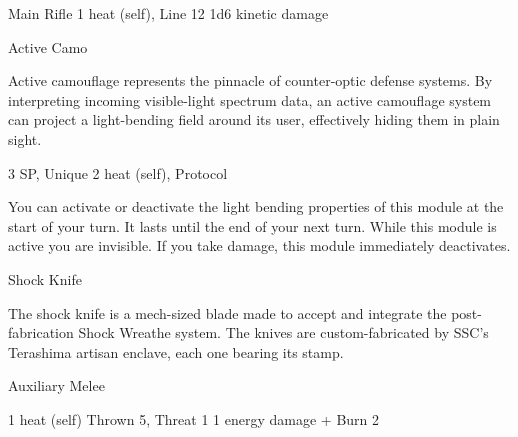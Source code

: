 \begin{mech}
Main Rifle
1 heat (self), Line 12
1d6 kinetic damage


Active Camo

Active camouflage represents the pinnacle of counter-optic defense systems. By interpreting incoming visible-light spectrum data, an active camouflage system can project a light-bending field around its user, effectively hiding them in plain sight.

3 SP, Unique
2 heat (self), Protocol

You can activate or deactivate the light bending properties of this module at the start of your turn. It lasts until the end of your next turn. While this module is active you are invisible. If you take damage, this module immediately deactivates.


Shock Knife

The shock knife is a mech-sized blade made to accept and integrate the post-fabrication Shock Wreathe system. The knives are custom-fabricated by SSC's Terashima artisan enclave, each one bearing its stamp.

Auxiliary Melee

1 heat (self)
Thrown 5, Threat 1
1 energy damage + Burn 2
\end{mech}
